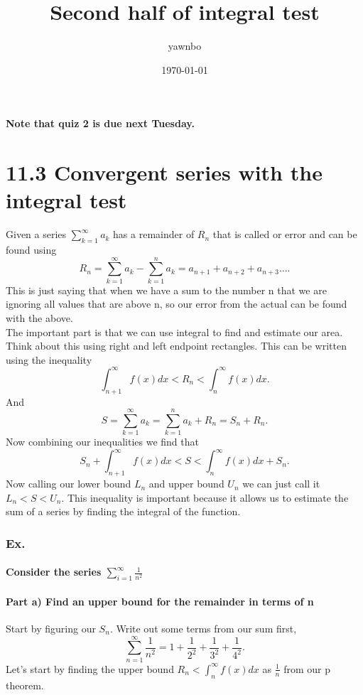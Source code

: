 \documentclass[a4paper]{article}
\title{Second half of integral test}
\author{yawnbo}
\date{\today}
\begin{document}
\maketitle
\paragraph{Note that quiz 2 is due next Tuesday. }
\section*{11.3 Convergent series with the integral test}%
\label{sec:11.3 Convergent series with the integral test}
Given a series $ \sum_{ k=1 } ^{ \infty } a_k $ has a remainder of $ R_n $ that is called or error and can be found using
\[
R_n = \sum_{ k=1 } ^{ \infty } a_k - \sum_{ k=1 } ^{ n } a_k = a_{ n+1 }+a_{ n+2 }+a_{ n+3 } \ldots
.\] 
This is just saying that when we have a sum to the number n that we are ignoring all values that are above n, so our error from the actual can be found with the above. \\

The important part is that we can use integral to find and estimate our area. Think about this using right and left endpoint rectangles. This can be written using the inequality
\[
\int_{ n+1 }^{ \infty } f\left( x \right) dx<R_n < \int_{ n }^{ \infty } f\left( x \right) dx
.\] 
And 
\[
S=\sum_{ k=1 } ^{ \infty } a_k = \sum_{ k=1 } ^{ n } a_k + R_n = S_n + R_n 
.\] 
Now combining our inequalities we find that 
\[
S_n + \int_{ n+1 }^{ \infty } f\left( x \right) dx<S < \int_{ n }^{ \infty } f\left( x \right) dx+S_n
.\] 
Now calling our lower bound $ L_n $ and upper bound $ U_n $ we can just call it $ L_n < S< U_n $. This inequality is important because it allows us to estimate the sum of a series by finding the integral of the function.


\subsubsection*{Ex. }
\paragraph{Consider the series $ \sum_{ i=1 } ^{ \infty } \frac{ 1 }{ n^2 }  $}
\paragraph{Part a) Find an upper bound for the remainder in terms of n}
Start by figuring our $ S_n $. Write out some terms from our sum first,
\[
\sum_{ n=1 } ^{ \infty } \frac{ 1 }{ n^2 } =1+\frac{ 1 }{ 2^2 } +\frac{ 1 }{ 3^2 } +\frac{ 1 }{ 4^2 } 
.\] 
Let's start by finding the upper bound $ R_n < \int_{ n }^{ \infty } f\left( x \right) dx$ as $ \frac{ 1 }{ n }  $ from our p theorem. 
\end{document}
